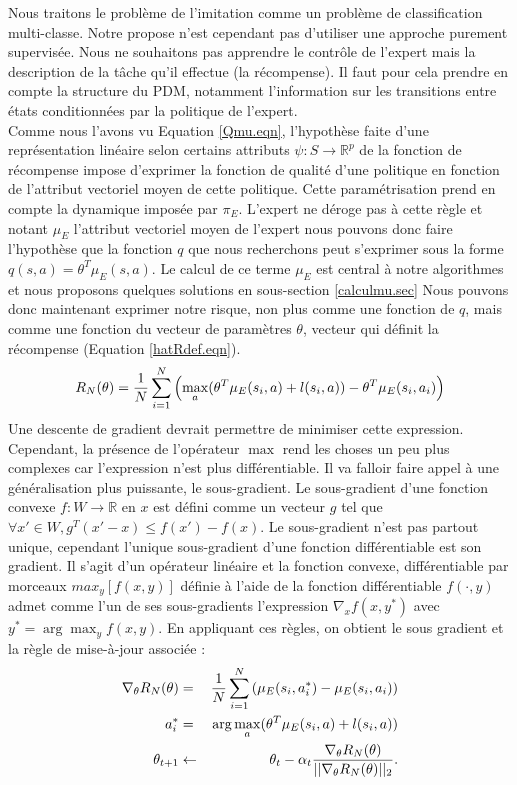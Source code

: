 \documentclass[publibook-draft]{CAp2012}
\begin{document}
Nous traitons le problème de l'imitation comme un problème de classification multi-classe. Notre propose n'est cependant pas d'utiliser une approche purement supervisée. Nous ne souhaitons pas apprendre le contrôle de l'expert mais la description de la tâche qu'il effectue (la récompense). Il faut pour cela prendre en compte la structure du PDM, notamment l'information sur les transitions entre états conditionnées par la politique de l'expert.\\

Comme nous l'avons vu Equation \eqref{Qmu.eqn}, l'hypothèse faite d'une représentation linéaire selon certains attributs $\psi : S\rightarrow \mathbb{R}^p$ de la fonction de récompense impose d'exprimer la fonction de qualité d'une politique en fonction de l'attribut vectoriel moyen de cette politique. Cette paramétrisation prend en compte la dynamique imposée par $\pi_E$. L'expert ne déroge pas à cette règle et notant $\mu_E$ l'attribut vectoriel moyen de l'expert nous pouvons donc faire l'hypothèse que la fonction $q$ que nous recherchons peut s'exprimer sous la forme $q(s,a) = \theta^T\mu_E(s,a)$. Le calcul de ce terme $\mu_E$ est central à notre algorithmes et nous proposons quelques solutions en sous-section \ref{calculmu.sec} Nous pouvons donc maintenant exprimer notre risque, non plus comme une fonction de $q$, mais comme une fonction du vecteur de paramètres $\theta$, vecteur qui définit la récompense (Equation \eqref{hatRdef.eqn}).
   \begin{equation}
     \label{structure.eqn}
   R_N(\theta)  = {1\over N} \sum_{i=1}^N\left(\max_a(\theta ^T \mu_E(s_i,a) + l(s_i,a)) - \theta ^T \mu_E(s_i,a_i) \right)
   \end{equation}
   Une descente de gradient devrait permettre de minimiser cette expression. Cependant, la présence de l'opérateur $\max$ rend les choses un peu plus complexes car l'expression n'est plus différentiable. Il va falloir faire appel à une généralisation plus puissante, le sous-gradient. Le sous-gradient d'une fonction convexe $f:W\rightarrow \mathbb{R}$ en $x$ est défini comme un vecteur $g$ tel que $\forall x' \in W, g^T(x'-x)\leq f(x')-f(x)$. Le sous-gradient n'est pas partout unique, cependant l'unique sous-gradient d'une fonction différentiable est son gradient. Il s'agit d'un opérateur linéaire et la fonction convexe, différentiable par morceaux $max_y[f(x,y)]$ définie à l'aide de la fonction différentiable $f(\cdot,y)$ admet comme l'un de ses sous-gradients l'expression $\nabla_xf(x,y^*)$ avec $y^*=\arg\max_yf(x,y)$. En appliquant ces règles, on obtient le sous gradient et la règle de mise-à-jour associée :
\begin{eqnarray}
\nabla_\theta R_N(\theta) &=& {1\over N}\sum\limits_{i=1}^N\left(\mu_E(s_i,a^*_i) - \mu_E(s_i,a_i)\right)\\
a^*_i &=& \arg\max_a(\theta ^T \mu_E(s_i,a) + l(s_i,a))\\
   \theta_{t+1} &\leftarrow& \theta_t -\alpha_t{\nabla_\theta R_N(\theta) \over ||\nabla_\theta R_N(\theta)||_2}.
\end{eqnarray}
\end{document}
